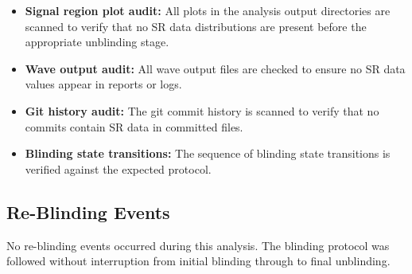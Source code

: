 \begin{itemize}
  \item \textbf{Signal region plot audit:} All plots in the analysis output
        directories are scanned to verify that no SR data distributions
        are present before the appropriate unblinding stage.

  \item \textbf{Wave output audit:} All wave output files are checked to
        ensure no SR data values appear in reports or logs.

  \item \textbf{Git history audit:} The git commit history is scanned to
        verify that no commits contain SR data in committed files.

  \item \textbf{Blinding state transitions:} The sequence of blinding state
        transitions is verified against the expected protocol.
\end{itemize}

\subsection{Re-Blinding Events}
\label{sec:blinding:reblinding}


No re-blinding events occurred during this analysis. The blinding protocol
was followed without interruption from initial blinding through to final
unblinding.


